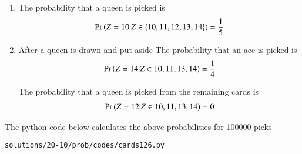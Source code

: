\begin{enumerate}
\item 
The probability that a queen is picked is 
\begin{align}
\Pr\left(Z = 10|Z \in \left\{10,11,12,13,14\right\}\right) = \frac{1}{5}
\end{align}
\item After a queen is drawn and put aside
The probability that an ace is picked is 
\begin{align}
\Pr\left(Z = 14|Z \in {10,11,13,14}\right)= \frac{1}{4}
\end{align}

The probability that a queen is picked from the remaining cards is 
\begin{align}
\Pr\left(Z=12|Z \in {10,11,13,14}\right) = 0
\end{align}
\end{enumerate}
The python code below calculates the above probabilities for 100000 picks
\begin{lstlisting}
solutions/20-10/prob/codes/cards126.py
\end{lstlisting}
